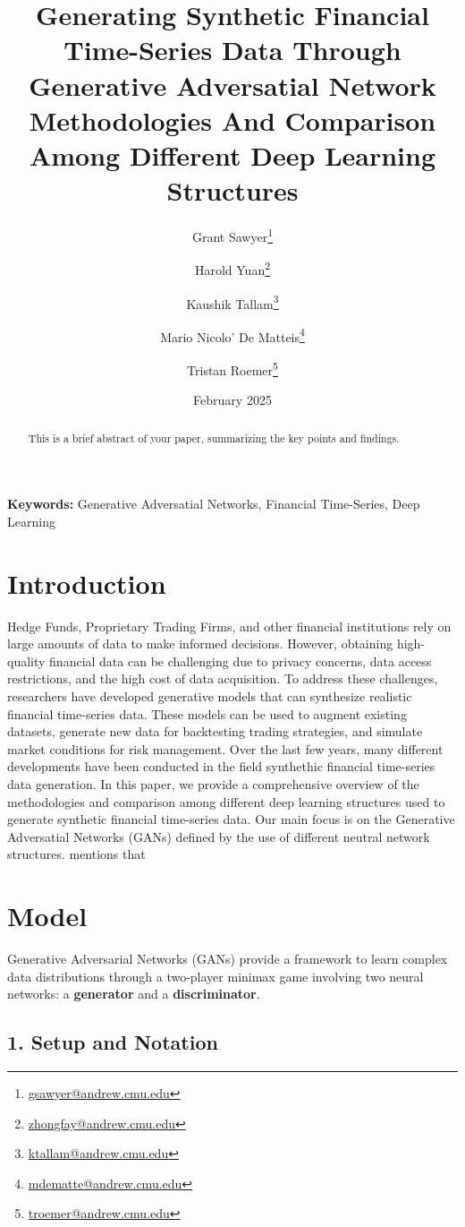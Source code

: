 \documentclass{article}
\title{Generating Synthetic Financial Time-Series Data Through Generative Adversatial Network\\[0.5em] \large Methodologies And Comparison Among Different Deep Learning Structures}
\author[1]{Grant Sawyer\thanks{\href{mailto:gsawyer@andrew.cmu.edu}{gsawyer@andrew.cmu.edu}}}
\author[1]{Harold Yuan\thanks{\href{mailto:zhongfay@andrew.cmu.edu}{zhongfay@andrew.cmu.edu}}}
\author[1]{Kaushik Tallam\thanks{\href{mailto:ktallam@andrew.cmu.edu}{ktallam@andrew.cmu.edu}}}
\author[1]{Mario Nicolo' De Matteis\thanks{\href{mailto:mdematte@andrew.cmu.edu}{mdematte@andrew.cmu.edu}}}
\author[1]{Tristan Roemer\thanks{\href{mailto:troemer@andrew.cmu.edu}{troemer@andrew.cmu.edu}}}
\affil[1]{Carnegie Mellon University, MSCF, New York, USA}
\date{February 2025}
\begin{document}
\maketitle

\begin{abstract}
    This is a brief abstract of your paper, summarizing the key points and findings.
\end{abstract}

\noindent \textbf{Keywords:} Generative Adversatial Networks, Financial Time-Series, Deep Learning

\section{Introduction}

Hedge Funds, Proprietary Trading Firms, and other financial institutions rely on large amounts of data to make informed decisions. However, obtaining high-quality financial data can be challenging due to privacy concerns, data access restrictions, and the high cost of data acquisition. To address these challenges, researchers have developed generative models that can synthesize realistic financial time-series data. These models can be used to augment existing datasets, generate new data for backtesting trading strategies, and simulate market conditions for risk management. Over the last few years, many different developments have been conducted in the field synthethic financial time-series data generation. In this paper, we provide a comprehensive overview of the methodologies and comparison among different deep learning structures used to generate synthetic financial time-series data. Our main focus is on the Generative Adversatial Networks (GANs) defined by the use of different neutral network structures. \textcite{EckerliFlorian2021GANi} mentions that

\section{Model}

Generative Adversarial Networks (GANs) provide a framework to learn complex data distributions through a two-player minimax game involving two neural networks: a \textbf{generator} and a \textbf{discriminator}.

\subsection*{1. Setup and Notation}
\end{document}
